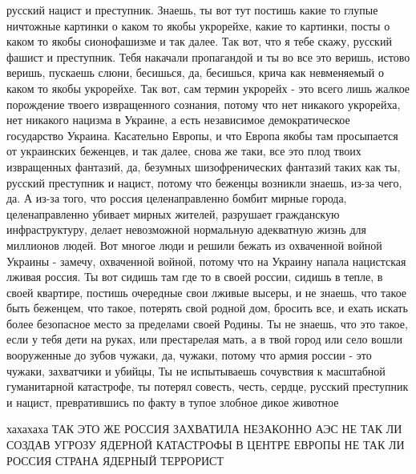 русский нацист и преступник. Знаешь, ты вот тут постишь какие то глупые
ничтожные картинки о каком то якобы укрорейхе, какие то картинки, посты о каком
то якобы сионофашизме и так далее. Так вот, что я тебе скажу, русский фашист и
преступник. Тебя накачали пропагандой и ты во все это веришь, истово веришь,
пускаешь слюни, бесишься, да, бесишься, крича как невменяемый о каком то якобы
укрорейхе. Так вот, сам термин укрорейх - это всего лишь жалкое порождение
твоего извращенного сознания, потому что нет никакого укрорейха, нет никакого
нацизма в Украине, а есть независимое демократическое государство Украина.
Касательно Европы, и что Европа якобы там просыпается от украинских беженцев, и
так далее, снова же таки, все это плод твоих извращенных фантазий, да, безумных
шизофренических фантазий таких как ты, русский преступник и нацист, потому что
беженцы возникли знаешь, из-за чего, да. А из-за того, что россия
целенаправленно бомбит мирные города, целенаправленно убивает мирных жителей,
разрушает гражданскую инфраструктуру, делает невозможной нормальную адекватную
жизнь для миллионов людей. Вот многое люди и решили бежать из охваченной войной
Украины - замечу, охваченной войной, потому что на Украину напала нацистская
лживая россия. Ты вот сидишь там где то в своей россии, сидишь в тепле, в своей
квартире, постишь очередные свои лживые высеры, и не знаешь, что такое быть
беженцем, что такое, потерять свой родной дом, бросить все, и ехать искать
более безопасное место за пределами своей Родины. Ты не знаешь, что это такое,
если у тебя дети на руках, или престарелая мать, а в твой город или село вошли
вооруженные до зубов чужаки, да, чужаки, потому что армия россии - это чужаки,
захватчики и убийцы, Ты не испытываешь сочувствия к масштабной гуманитарной
катастрофе, ты потерял совесть, честь, сердце, русский преступник и нацист,
превратившись по факту в тупое злобное дикое животное

хахахаха ТАК ЭТО ЖЕ РОССИЯ ЗАХВАТИЛА НЕЗАКОННО АЭС НЕ ТАК ЛИ СОЗДАВ УГРОЗУ
ЯДЕРНОЙ КАТАСТРОФЫ В ЦЕНТРЕ ЕВРОПЫ НЕ ТАК ЛИ РОССИЯ СТРАНА ЯДЕРНЫЙ ТЕРРОРИСТ

